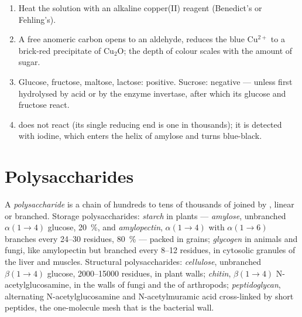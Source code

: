 \begin{method}\label{met:b1:carbohydrates:reducing}
\begin{enumerate}
  \item Heat the solution with an alkaline copper(II) reagent
        (Benedict's or Fehling's).
  \item A free anomeric carbon opens to an aldehyde, reduces the blue
        $\mathrm{Cu^{2+}}$ to a brick-red precipitate of $\mathrm{Cu_2O}$;
        the depth of colour scales with the amount of sugar.
  \item Glucose, fructose, maltose, lactose: positive. Sucrose: negative
        --- unless first hydrolysed by acid or by the enzyme invertase,
        after which its glucose and fructose react.
  \item {} does not react (its single reducing end is one in
        thousands); it is detected with iodine, which enters the helix
        of amylose and turns blue-black.
\end{enumerate}
\end{method}

\section{Polysaccharides}

\begin{definition}[Polysaccharide]\label{def:b1:carbohydrates:polysaccharide}
A \emph{polysaccharide} is a chain of hundreds to
tens of thousands of  joined by , linear
or branched. Storage polysaccharides: \emph{starch} in
plants --- \emph{amylose}, unbranched $\alpha(1{\to}4)$ glucose,
\qty{20}{\%}, and \emph{amylopectin}, $\alpha(1{\to}4)$ with
$\alpha(1{\to}6)$ branches every \qtyrange{24}{30}{} residues,
\qty{80}{\%} --- packed in grains; \emph{glycogen} in
animals and fungi, like amylopectin but branched every
\qtyrange{8}{12}{} residues, in cytosolic granules of the liver and
muscles. Structural polysaccharides: \emph{cellulose},
unbranched $\beta(1{\to}4)$ glucose, \qtyrange{2000}{15000}{} residues,
in plant walls; \emph{chitin}, $\beta(1{\to}4)$
N-acetylglucosamine, in the walls of fungi and the  of
arthropods; \emph{peptidoglycan}, alternating
N-acetylglucosamine and N-acetylmuramic acid cross-linked by short
peptides, the one-molecule mesh that is the bacterial wall.
\end{definition}

